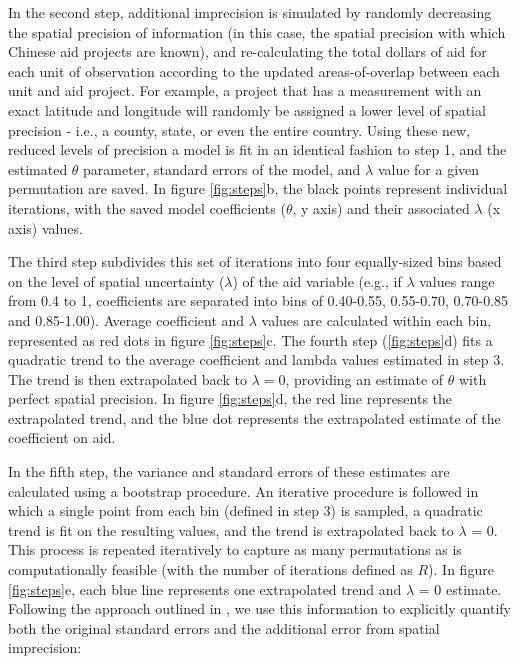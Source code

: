 \par 
In the second step, additional imprecision is simulated by randomly decreasing the spatial precision of information (in this case, the spatial precision with which Chinese aid projects are known), and re-calculating the total dollars of aid for each unit of observation according to the updated areas-of-overlap between each unit and aid project. 
For example, a project that has a measurement with an exact latitude and longitude will randomly be assigned a lower level of spatial precision - i.e., a county, state, or even the entire country. 
Using these new, reduced levels of precision a model is fit in an identical fashion to step 1, and the estimated $\theta$ parameter, standard errors of the model, and $\lambda$ value for a given permutation are saved.
In figure \ref{fig:steps}b, the black points represent individual iterations, with the saved model coefficients ($\theta$, y axis) and their associated $\lambda$ (x axis) values. 
\par
The third step subdivides this set of iterations into four equally-sized bins based on the level of spatial uncertainty ($\lambda$) of the aid variable (e.g., if $\lambda$ values range from 0.4 to 1, coefficients are separated into bins of 0.40-0.55, 0.55-0.70, 0.70-0.85 and 0.85-1.00). 
Average coefficient and $\lambda$ values are calculated within each bin, represented as red dots in figure \ref{fig:steps}c. 
The fourth step (\ref{fig:steps}d) fits a quadratic trend to the average coefficient and lambda values estimated in step 3.  
The trend is then extrapolated back to $\lambda=0$, providing an estimate of $\theta$ with perfect spatial precision. 
In figure \ref{fig:steps}d, the red line represents the extrapolated trend, and the blue dot represents the extrapolated estimate of the coefficient on aid. 
\par 

In the fifth step, the variance and standard errors of these estimates are calculated using a bootstrap procedure. 
An iterative procedure is followed in which a single point from each bin (defined in step 3) is sampled, a quadratic trend is fit on the resulting values, and the trend is extrapolated back to $\lambda$ = 0. 
This process is repeated iteratively to capture as many permutations as is computationally feasible (with the number of iterations defined as $R$). 
In figure \ref{fig:steps}e, each blue line represents one extrapolated trend and $\lambda$ = 0 estimate. 
Following the approach outlined in \cite{burnham_information_2002}, we use this information to explicitly quantify both the original standard errors and the additional error from spatial imprecision:

